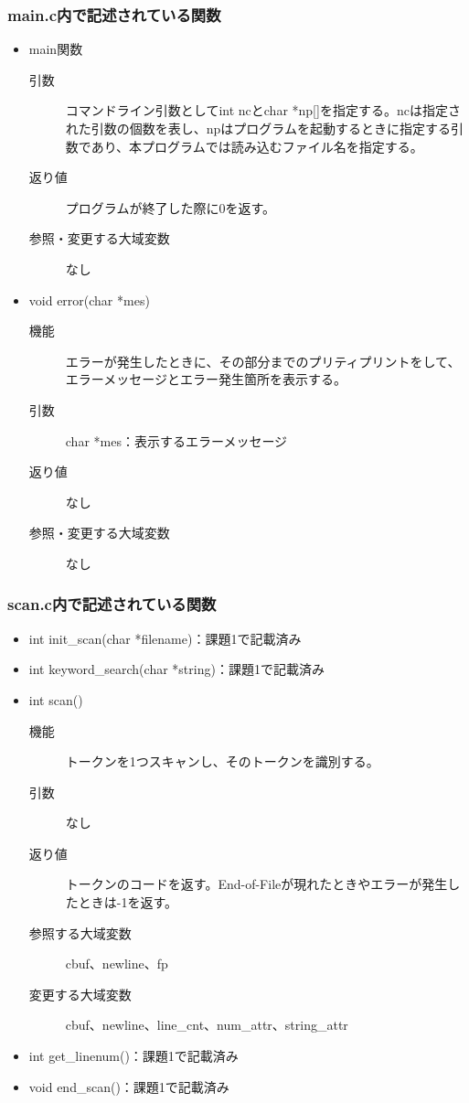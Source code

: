 \documentclass{jarticle}
\begin{document}
\subsubsection{main.c内で記述されている関数}
\begin{itemize}
  \item main関数
  \begin{description}
\item[引数]コマンドライン引数としてint ncとchar
*np[]を指定する。ncは指定された引数の個数を表し、npはプログラムを起動するときに指定する引数であり、本プログラムでは読み込むファイル名を指定する。
\item[返り値]プログラムが終了した際に0を返す。
\item[参照・変更する大域変数]なし
\end{description}
\item void error(char *mes)
\begin{description}
\item[機能]エラーが発生したときに、その部分までのプリティプリントをして、エラーメッセージとエラー発生箇所を表示する。
\item[引数]char *mes：表示するエラーメッセージ
\item[返り値]なし
\item[参照・変更する大域変数]なし
\end{description}
\end{itemize}
\subsubsection{scan.c内で記述されている関数}
\begin{itemize}
  \item int init\_scan(char *filename)：課題1で記載済み
  \item int keyword\_search(char *string)：課題1で記載済み
  \item int scan()
  \begin{description}
\item[機能]トークンを1つスキャンし、そのトークンを識別する。
\item[引数]なし
\item[返り値]トークンのコードを返す。End-of-Fileが現れたときやエラーが発生したときは-1を返す。
\item[参照する大域変数]cbuf、newline、fp
\item[変更する大域変数]cbuf、newline、line\_cnt、num\_attr、string\_attr
\end{description}
\item int get\_linenum()：課題1で記載済み
\item void end\_scan()：課題1で記載済み
\end{itemize}
\end{document}

